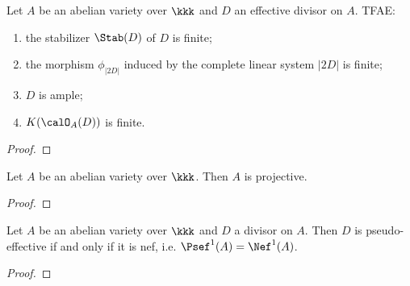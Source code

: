     \begin{theorem}\label{thm:ample_criteria_for_abelian_varieties}
        Let \(A\) be an abelian variety over \(\kkk\) and \(D\) an effective divisor on \(A\).
        TFAE:
        \begin{enumerate}
            \item the stabilizer \(\Stab(D)\) of \(D\) is finite;
            \item the morphism \(\phi_{|2D|}\) induced by the complete linear system \(|2D|\) is finite;
            \item \(D\) is ample;
            \item \(K(\calO_A(D))\) is finite.
        \end{enumerate}
    \end{theorem}
    \begin{proof}
    \end{proof}

    \begin{theorem}\label{thm: abelian varieties are projective}
        Let $A$ be an abelian variety over $\kkk$. 
        Then $A$ is projective.
    \end{theorem}
    \begin{proof}
    \end{proof}

    \begin{corollary}\label{cor:psef_iff_nef_for_abelian_varieties}
        Let \(A\) be an abelian variety over \(\kkk\) and \(D\) a divisor on \(A\).
        Then \(D\) is pseudo-effective if and only if it is nef, i.e. \(\Psef^1(A) = \Nef^1(A)\).
    \end{corollary}
    \begin{proof}
    \end{proof}




